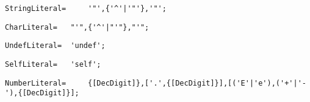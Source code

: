 \documentclass{article}
\begin{document}
    \begin{flushleft}
    \begin{lstlisting}[mathescape=true, breaklines=true]
     StringLiteral= 	'"',{'^'|'"'},'"';
    \end{lstlisting}
    \end{flushleft}
    \begin{flushleft}
    \begin{lstlisting}[mathescape=true, breaklines=true]
     CharLiteral= 	"'",{'^'|"'"},"'";
    \end{lstlisting}
    \end{flushleft}
    \begin{flushleft}
    \begin{lstlisting}[mathescape=true, breaklines=true]
     UndefLiteral= 	'undef';
    \end{lstlisting}
    \end{flushleft}
    \begin{flushleft}
    \begin{lstlisting}[mathescape=true, breaklines=true]
     SelfLiteral= 	'self';
    \end{lstlisting}
    \end{flushleft}
    \begin{flushleft}
    \begin{lstlisting}[mathescape=true, breaklines=true]
     NumberLiteral= 	{[DecDigit]},['.',{[DecDigit]}],[('E'|'e'),('+'|'-'),{[DecDigit]}];
    \end{lstlisting}
    \end{flushleft}
\end{document}
